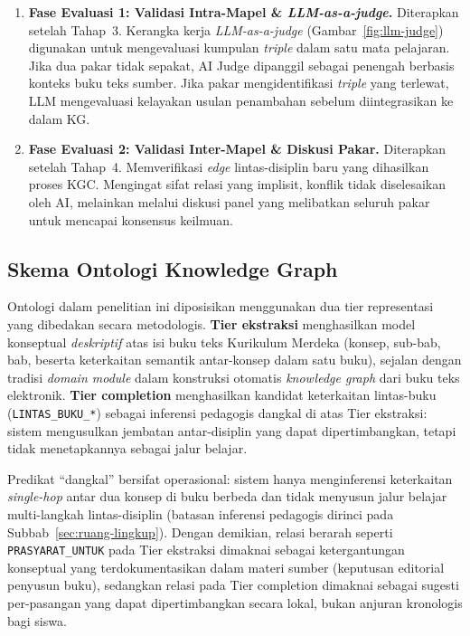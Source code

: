 \documentclass[main]{subfiles}
\begin{document}
\begin{enumerate}
  \item \textbf{Fase Evaluasi 1: Validasi Intra-Mapel \&
        \textit{LLM-as-a-judge}.} Diterapkan setelah Tahap~3. Kerangka
        kerja \textit{LLM-as-a-judge} (Gambar~\ref{fig:llm-judge})
        digunakan untuk mengevaluasi kumpulan \textit{triple} dalam satu
        mata pelajaran. Jika dua pakar tidak sepakat, AI Judge dipanggil
        sebagai penengah berbasis konteks buku teks sumber. Jika pakar
        mengidentifikasi \textit{triple} yang terlewat, LLM mengevaluasi
        kelayakan usulan penambahan sebelum diintegrasikan ke dalam KG.

  \item \textbf{Fase Evaluasi 2: Validasi Inter-Mapel \& Diskusi
        Pakar.} Diterapkan setelah Tahap~4. Memverifikasi \textit{edge}
        lintas-disiplin baru yang dihasilkan proses KGC. Mengingat
        sifat relasi yang implisit, konflik tidak diselesaikan oleh AI,
        melainkan melalui diskusi panel yang melibatkan seluruh pakar
        untuk mencapai konsensus keilmuan.
\end{enumerate}



\subsection{Skema Ontologi Knowledge Graph}
\label{subsec:skema-ontologi}

Ontologi dalam penelitian ini diposisikan menggunakan dua tier
representasi yang dibedakan secara metodologis. \textbf{Tier
ekstraksi} menghasilkan model konseptual \textit{deskriptif} atas isi
buku teks Kurikulum Merdeka (konsep, sub-bab, bab, beserta
keterkaitan semantik antar-konsep dalam satu buku), sejalan dengan
tradisi \textit{domain module} dalam konstruksi otomatis \textit{knowledge
graph} dari buku teks elektronik. \textbf{Tier completion} menghasilkan kandidat
keterkaitan lintas-buku (\texttt{LINTAS\_BUKU\_*}) sebagai inferensi
pedagogis dangkal di atas Tier ekstraksi: sistem mengusulkan jembatan
antar-disiplin yang dapat dipertimbangkan, tetapi tidak menetapkannya
sebagai jalur belajar.

Predikat ``dangkal'' bersifat operasional: sistem hanya menginferensi
keterkaitan \textit{single-hop} antar dua konsep di buku berbeda dan
tidak menyusun jalur belajar multi-langkah lintas-disiplin (batasan
inferensi pedagogis dirinci pada Subbab~\ref{sec:ruang-lingkup}).
Dengan demikian, relasi berarah seperti
\texttt{PRASYARAT\_UNTUK} pada Tier ekstraksi dimaknai sebagai
ketergantungan konseptual yang terdokumentasikan dalam materi sumber
(keputusan editorial penyusun buku), sedangkan relasi pada Tier
completion dimaknai sebagai sugesti per-pasangan yang dapat
dipertimbangkan secara lokal, bukan anjuran kronologis bagi siswa.
\end{document}
